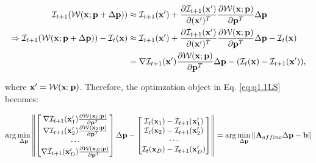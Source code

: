 \documentclass[11pt]{article}
\begin{document}
\begin{align} \label{general_warping_expansion}
    \I_{t+1}(\Wxdp)
    & \approx
    \I_{t+1}(\x')+
    \frac{\partial \I_{t+1}(\x')}{\partial(\x')^T}
    \frac{\partial \W(\x; \p)} {\partial \p^T} \Delta \p
    \\ \Rightarrow
    \I_{t+1}(\Wxdp) - \I_t(\x)
    & \approx
    \I_{t+1} (\x') +
    \frac {\partial \I_{t+1}(\x')} {\partial(\x')^T}
    \frac{\partial \W(\x; \p)} {\partial \p^T}
    \Delta \p - \I_t(\x) \\
    &= \nabla \I_{t+1}(\x')
    \frac{\partial \W(\x; \p)} {\partial \p^T}
    \Delta \p - (\I_t(\x) - \I_{t+1} (\x')),
\end{align}

where $\x'=\Wxp$. Therefore, the optimzation object in Eq. \ref{eq:q1.1LS} becomes:

\begin{equation} \label{general_optimization_object}
    \arg\min_{\Delta \p}
    \left \|
    \begin{bmatrix}
        \nabla \I_{t+1}(\x_1') \frac{\partial\W(\x_1;\p)}{\partial \p^T} \\
        \nabla \I_{t+1}(\x_2') \frac{\partial\W(\x_2;\p)}{\partial \p^T} \\
        \cdots\\
        \nabla \I_{t+1}(\x_D') \frac{\partial\W(\x_D;\p)}{\partial \p^T}
    \end{bmatrix}
    \Delta \p -
    \begin{bmatrix}
        \I_t(\x_1) - \I_{t+1} (\x_1')\\
        \I_t(\x_2) - \I_{t+1} (\x_2')\\
        \cdots\\
        \I_t(\x_D) - \I_{t+1} (\x_D')\\
    \end{bmatrix}
    \right \|
    =
    \arg\min_{\Delta \p}
    \| \A_{affine}\Delta\p - \mathbf{b} \|
\end{equation}
\end{document}
